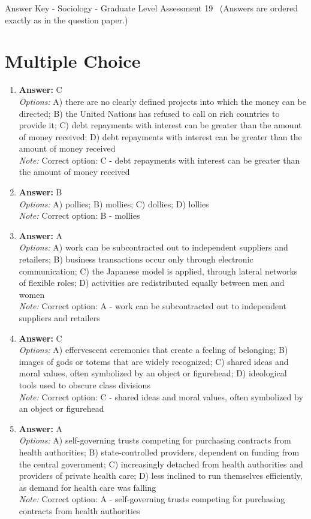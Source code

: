 \documentclass[12pt]{article}
\begin{document}
\begin{center}
Answer Key - Sociology - Graduate Level Assessment 19 \
\small (Answers are ordered exactly as in the question paper.)
\end{center}

\section*{Multiple Choice}
\begin{enumerate}[label=\arabic*.]
\item \textbf{Answer:} C
\\ \textit{Options:} A) there are no clearly defined projects into which the money can be directed; B) the United Nations has refused to call on rich countries to provide it; C) debt repayments with interest can be greater than the amount of money received; D) debt repayments with interest can be greater than the amount of money received
\\ \textit{Note:} Correct option: C - debt repayments with interest can be greater than the amount of money received
\item \textbf{Answer:} B
\\ \textit{Options:} A) pollies; B) mollies; C) dollies; D) lollies
\\ \textit{Note:} Correct option: B - mollies
\item \textbf{Answer:} A
\\ \textit{Options:} A) work can be subcontracted out to independent suppliers and retailers; B) business transactions occur only through electronic communication; C) the Japanese model is applied, through lateral networks of flexible roles; D) activities are redistributed equally between men and women
\\ \textit{Note:} Correct option: A - work can be subcontracted out to independent suppliers and retailers
\item \textbf{Answer:} C
\\ \textit{Options:} A) effervescent ceremonies that create a feeling of belonging; B) images of gods or totems that are widely recognized; C) shared ideas and moral values, often symbolized by an object or figurehead; D) ideological tools used to obscure class divisions
\\ \textit{Note:} Correct option: C - shared ideas and moral values, often symbolized by an object or figurehead
\item \textbf{Answer:} A
\\ \textit{Options:} A) self-governing trusts competing for purchasing contracts from health authorities; B) state-controlled providers, dependent on funding from the central government; C) increasingly detached from health authorities and providers of private health care; D) less inclined to run themselves efficiently, as demand for health care was falling
\\ \textit{Note:} Correct option: A - self-governing trusts competing for purchasing contracts from health authorities
\end{enumerate}
\end{document}
